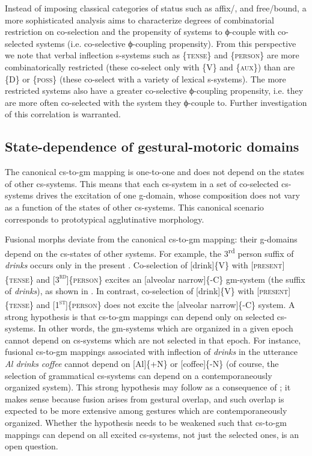   Instead of imposing classical categories of  status such as affix/, and free/bound, a more sophisticated analysis aims to characterize degrees of combinatorial restriction on co-selection and the propensity of systems to ϕ-couple with co-selected systems (i.e. co-selective ϕ-coupling propensity). From this perspective we note that verbal inflection s-systems such as \{\textsc{tense}\} and \{\textsc{person}\} are more combinatorically restricted (these co-select only with \{V\} and \{\textsc{aux}\}) than are \{D\} or \{\textsc{poss}\} (these co-select with a variety of lexical s-systems). The more restricted systems also have a greater co-selective ϕ-coupling propensity, i.e. they are more often co-selected with the system they ϕ-couple to. Further investigation of this correlation is warranted.

\subsection{State-dependence of gestural-motoric domains}

The canonical cs-to-gm mapping is one-to-one and does not depend on the states of other cs-systems. This means that each cs-system in a set of co-selected cs-systems drives the excitation of one g-domain, whose composition does not vary as a function of the states of other cs-systems. This canonical scenario corresponds to prototypical agglutinative morphology. 

  Fusional morphs deviate from the canonical cs-to-gm mapping: their g-do\-mains depend on the cs-states of other systems. For example, the 3\textsuperscript{rd} person suffix of \textit{drinks} occurs only in the present . Co-selection of [drink]\{V\} with [\textsc{present}]\{\textsc{tense}\} and [\textsc{3}\textsc{\textsuperscript{rd}}]\{\textsc{person}\} excites an [alveolar narrow]\{-C\} gm-sys\-tem (the suffix of \textit{drinks}), as shown in {}. In contrast, co-selection of [drink]\linebreak\relax\{V\} with [\textsc{present]}\{\textsc{tense}\} and [\textsc{1}\textsc{\textsuperscript{st}}]\{\textsc{person}\} does not excite the [alveolar narrow]\linebreak\relax\{-C\} system. A strong hypothesis is that cs-to-gm mappings can depend only on selected cs-systems. In other words, the gm-sys\-tems which are organized in a given epoch cannot depend on cs-systems which are not selected in that epoch. For instance, fusional cs-to-gm mappings associated with inflection of \textit{drinks} in the utterance \textit{Al drinks coffee} cannot depend on [Al]\{+N\} or [coffee]\{-N\} (of course, the selection of grammatical cs-systems can depend on a contemporaneously organized system). This strong hypothesis may follow as a consequence of ; it makes sense because fusion arises from gestural overlap, and such overlap is expected to be more extensive among gestures which are contemporaneously organized. Whether the hypothesis needs to be weakened such that cs-to-gm mappings can depend on all excited cs-systems, not just the selected ones, is an open question.

